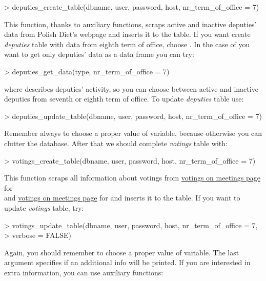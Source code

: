\begin{example}
> deputies_create_table(dbname, user, password, host, nr_term_of_office = 7)
\end{example}

This function, thanks to auxiliary functions, scraps active and inactive deputies' data from Polish Diet's webpage and inserts it to the table. If you want create \emph{deputies} table with data from eighth term of office, choose .
In the case of you want to get only deputies' data as a data frame you can try:

\begin{example}
> deputies_get_data(type, nr_term_of_office = 7)
\end{example}

where  describes deputies' activity, so you can choose between active and inactive deputies from seventh or eighth term of office. To update \emph{deputies} table use:

\begin{example}
> deputies_update_table(dbname, user, password, host, nr_term_of_office = 7)
\end{example}

Remember always to choose a proper value of  variable, because otherwise you can clutter the database. After that we should complete \emph{votings} table with:

\begin{example}
> votings_create_table(dbname, user, password, host, nr_term_of_office = 7)
\end{example}

This function scraps all information about votings from \href{http://www.sejm.gov.pl/Sejm7.nsf/agent.xsp?symbol=posglos&NrKadencji=7}{votings on meetings page} for \\  and \href{http://www.sejm.gov.pl/Sejm8.nsf/agent.xsp?symbol=posglos&NrKadencji=8}{votings on meetings page} for  and inserts it to the table. If you want to update \emph{votings} table, try:

\begin{example}
> votings_update_table(dbname, user, password, host, nr_term_of_office = 7,
> 	verbose = FALSE)
\end{example}

Again, you should remember to choose a proper value of  variable. The last argument specifies if an additional info will be printed. If you are interested in extra information, you can use auxiliary functions:

